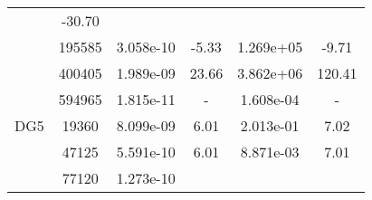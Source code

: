 \begin{table}
\begin{center}
{\begin{tabular}{| l | c | c | c | c | c |}
                &-30.70\\
                
            &195585
            
                &3.058e-10
                
                &-5.33
                
                &1.269e+05
                
                &-9.71\\
                
            &400405
            
                &1.989e-09
                
                &23.66
                
                &3.862e+06
                
                &120.41\\
                
            &594965
            
                &1.815e-11
                
                &-
                
                &1.608e-04
                
                &-\\
                \hline
        \hline
        \hspace{0.1cm}DG5\hspace{0.1cm}    
        
            &19360
            
                &8.099e-09
                
                &6.01
                
                &2.013e-01
                
                &7.02\\
                
            &47125
            
                &5.591e-10
                
                &6.01
                
                &8.871e-03
                
                &7.01\\
                
            &77120
            
                &1.273e-10
                

\end{tabular}}
\end{center}
\end{table}
